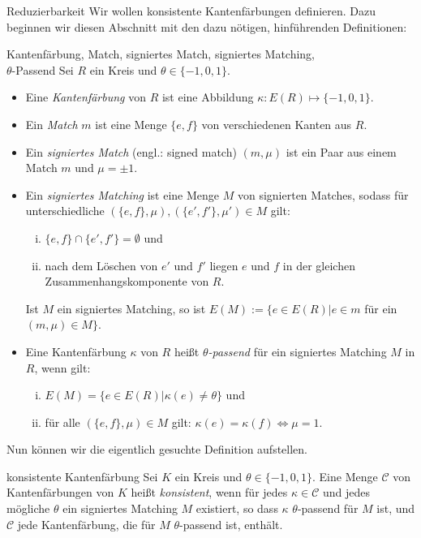 \begin{section}{Reduzierbarkeit}
 Wir wollen konsistente Kantenfärbungen definieren. Dazu beginnen wir diesen Abschnitt mit den dazu nötigen, hinführenden Definitionen:

 \begin{definition}{Kantenfärbung, Match, signiertes Match, signiertes Matching, \\$\theta$-Passend}
  Sei $R$ ein Kreis und $\theta \in \{-1,0,1\}$.
  \begin{itemize}
   \item Eine \textit{Kantenfärbung} von $R$ ist eine Abbildung $\kappa: E(R) \mapsto \{-1,0,1\}$.
   \item Ein \textit{Match} $m$ ist eine Menge $\{e,f\}$ von verschiedenen Kanten aus $R$. 
   \item Ein \textit{signiertes Match} (engl.: signed match) $(m,\mu)$ ist ein Paar aus einem Match $m$ und $\mu = \pm 1$.
   \item Ein \textit{signiertes Matching} ist eine Menge $M$ von signierten Matches, sodass für unterschiedliche $(\{e,f\},\mu),(\{e',f'\},\mu') \in M$ gilt:
   \begin{enumerate}[(i)]
    \item $\{e,f\}\cap\{e',f'\} = \emptyset$ und
    \item nach dem Löschen von $e'$ und $f'$ liegen $e$ und $f$ in der gleichen Zusammenhangskomponente von $R$.
   \end{enumerate}
   Ist $M$ ein signiertes Matching, so ist $E(M) := \{e\in E(R) | e\in m $ für ein $(m,\mu) \in M\}$.
   \item Eine Kantenfärbung $\kappa$ von $R$ heißt \textit{$\theta$-passend} für ein signiertes Matching $M$ in $R$, wenn gilt:
   \begin{enumerate}[(i)]
    \item $E(M) = \{e \in E(R) | \kappa(e) \neq \theta\}$ und
    \item für alle $(\{e,f\},\mu) \in M$ gilt: $\kappa(e) = \kappa(f) \Leftrightarrow \mu = 1$.
   \end{enumerate}
  \end{itemize}
 \end{definition}
 
 Nun können wir die eigentlich gesuchte Definition aufstellen.
  
 \begin{definition}{konsistente Kantenfärbung}
  Sei $K$ ein Kreis und $\theta \in \{-1,0,1\}$. Eine Menge $\mathscr{C}$ von Kantenfärbungen von $K$ heißt \textit{konsistent}, wenn für jedes $\kappa \in \mathscr{C}$ und jedes mögliche $\theta$ ein signiertes Matching $M$ existiert, so dass $\kappa$ $\theta$-passend für $M$ ist, und $\mathscr{C}$ jede Kantenfärbung, die für $M$ $\theta$-passend ist, enthält.
 \end{definition}


\end{section}

